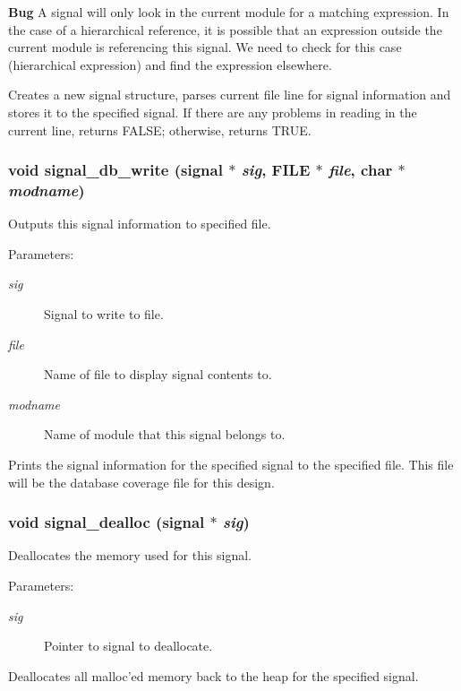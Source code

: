 \begin{Desc}
\item[{\bf Bug}]A signal will only look in the current module for a matching expression. In the case of a hierarchical reference, it is possible that an expression outside the current module is referencing this signal. We need to check for this case (hierarchical expression) and find the expression elsewhere.\end{Desc}
Creates a new signal structure, parses current file line for signal information and stores it to the specified signal. If there are any problems in reading in the current line, returns FALSE; otherwise, returns TRUE. 
\subsubsection{\setlength{\rightskip}{0pt plus 5cm}void signal\_\-db\_\-write ({\bf signal} $\ast$ {\em sig}, FILE $\ast$ {\em file}, char $\ast$ {\em modname})}\label{signal_8c_a4}


Outputs this signal information to specified file.

\begin{Desc}
\item[Parameters:]
\begin{description}
\item[{\em sig}]Signal to write to file. \item[{\em file}]Name of file to display signal contents to. \item[{\em modname}]Name of module that this signal belongs to.\end{description}
\end{Desc}
Prints the signal information for the specified signal to the specified file. This file will be the database coverage file for this design. 
\subsubsection{\setlength{\rightskip}{0pt plus 5cm}void signal\_\-dealloc ({\bf signal} $\ast$ {\em sig})}\label{signal_8c_a10}


Deallocates the memory used for this signal.

\begin{Desc}
\item[Parameters:]
\begin{description}
\item[{\em sig}]Pointer to signal to deallocate.\end{description}
\end{Desc}
Deallocates all malloc'ed memory back to the heap for the specified signal. 
